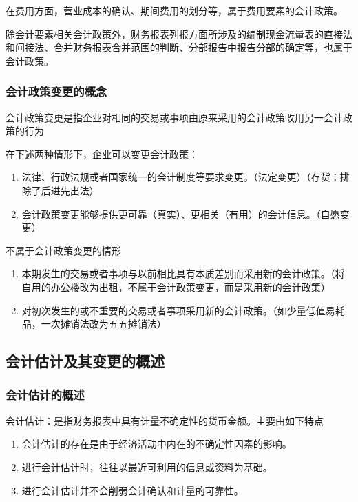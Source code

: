 \documentclass[UTF8,12pt]{ctexart}
\numberwithin{equation}{section} %
\numberwithin{figure}{section}
\numberwithin{table}{section}
\begin{document}
	在费用方面，营业成本的确认、期间费用的划分等，属于费用要素的会计政策。
	
	除会计要素相关会计政策外，财务报表列报方面所涉及的编制现金流量表的直接法和间接法、合并财务报表合并范围的判断、分部报告中报告分部的确定等，也属于会计政策。
	
	\subsubsection{会计政策变更的概念}
	会计政策变更是指企业对相同的交易或事项由原来采用的会计政策改用另一会计政策的行为
	
	在下述两种情形下，企业可以变更会计政策：
	\begin{enumerate}
		\item 法律、行政法规或者国家统一的会计制度等要求变更。（法定变更）（存货：排除了后进先出法）
		
		\item 会计政策变更能够提供更可靠（真实）、更相关（有用）的会计信息。（自愿变更）
	\end{enumerate}
	
	不属于会计政策变更的情形
	\begin{enumerate}
		\item 本期发生的交易或者事项与以前相比具有本质差别而采用新的会计政策。（将自用的办公楼改为出租，不属于会计政策变更，而是采用新的会计政策）
		
		\item 对初次发生的或不重要的交易或者事项采用新的会计政策。（如少量低值易耗品，一次摊销法改为五五摊销法）
	\end{enumerate}
	
	
	\subsection{会计估计及其变更的概述}
	\subsubsection{会计估计的概述}
	会计估计：是指财务报表中具有计量不确定性的货币金额。主要由如下特点
	\begin{enumerate}
		\item 会计估计的存在是由于经济活动中内在的不确定性因素的影响。
		
		\item 进行会计估计时，往往以最近可利用的信息或资料为基础。
		
		\item 进行会计估计并不会削弱会计确认和计量的可靠性。
	\end{enumerate}
	
\end{document}
